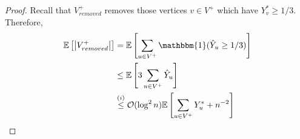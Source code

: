 \begin{proof}
	Recall that $V_{removed}^+$ removes those vertices $v \in V^+$ which have $Y_v^* \ge 1/3$. Therefore,
	\begin{align*}
	    \mathbb{E} \left[ \left| V_{removed}^+ \right| \right] &= \mathbb{E} \left[ \sum_{u \in V^+} \mathbbm{1} (\hat{Y}_u \ge 1/3) \right]\\
	    &\le \mathbb{E} \left[ 3\sum_{u \in V^+} \hat{Y}_u \right]\\
	    &\overset{(i)}{\le} \mathcal{O} (\log^2 n) \mathbb{E} \left[ \sum_{u \in V^+} Y_u^* + n^{-2} \right]
	\end{align*}
\end{proof}

